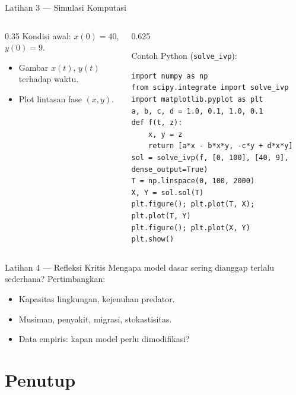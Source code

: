 \documentclass[aspectratio=32]{beamer}
\begin{document}
\begin{frame}[fragile]{Latihan 3 — Simulasi Komputasi}
  


\begin{columns}
	\begin{column}{0.35\textwidth}	
	Kondisi awal: \(x(0)=40\), \(y(0)=9\).
	  \begin{itemize}
	    \item Gambar \(x(t)\), \(y(t)\) terhadap waktu.
	    \item Plot lintasan fase \((x,y)\).
	  \end{itemize}
	\end{column}
	\begin{column}{0.625\textwidth}
		\begin{block}{Contoh Python (\texttt{solve\_ivp}):}
\begin{verbatim}
import numpy as np
from scipy.integrate import solve_ivp
import matplotlib.pyplot as plt
a, b, c, d = 1.0, 0.1, 1.0, 0.1
def f(t, z):
    x, y = z
    return [a*x - b*x*y, -c*y + d*x*y]
sol = solve_ivp(f, [0, 100], [40, 9], dense_output=True)
T = np.linspace(0, 100, 2000)
X, Y = sol.sol(T)
plt.figure(); plt.plot(T, X); plt.plot(T, Y)
plt.figure(); plt.plot(X, Y)
plt.show()
\end{verbatim}
		\end{block}
	\end{column}
\end{columns}



\end{frame}

\begin{frame}{Latihan 4 — Refleksi Kritis}
  Mengapa model dasar sering dianggap terlalu sederhana? Pertimbangkan:
  \begin{itemize}
    \item Kapasitas lingkungan, kejenuhan predator.
    \item Musiman, penyakit, migrasi, stokastisitas.
    \item Data empiris: kapan model perlu dimodifikasi?
  \end{itemize}
\end{frame}

\section{Penutup}
\end{document}
